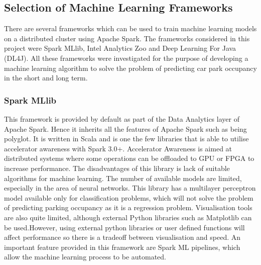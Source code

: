\subsection{ Selection of Machine Learning Frameworks}
    \begin{flushleft}
    There are several frameworks which can be used to train machine learning models on a distributed cluster using Apache Spark. The frameworks considered in this project were Spark MLlib, Intel Analytics Zoo and Deep Learning For Java (DL4J). All these frameworks were investigated for the purpose of developing a machine learning algorithm to solve the problem of predicting car park occupancy in the short and long term. 
    \end{flushleft}
 
    \subsubsection{Spark MLlib}
        \begin{flushleft}
        This framework is provided by default as part of the Data Analytics layer of Apache Spark. Hence it inherits all the features of Apache Spark such as being polyglot. It is written in Scala and is one the few libraries that is able to utilise accelerator awareness with Spark 3.0+. Accelerator Awareness is aimed at distributed systems where some operations can be offloaded to GPU or FPGA to increase performance. The disadvantages of this library is lack of suitable algorithms for machine learning. The number of available models are limited, especially in the area of neural networks. This library has a multilayer perceptron model available only for classification problems, which will not solve the problem of predicting parking occupancy as it is a regression problem. Visualisation tools are also quite limited, although external Python libraries such as Matplotlib can be used.However, using external python libraries or user defined functions will affect performance so there is a tradeoff between visualisation and speed. An important feature provided in this framework are Spark ML pipelines, which allow the machine learning process to be automated.  
        \end{flushleft}
 
